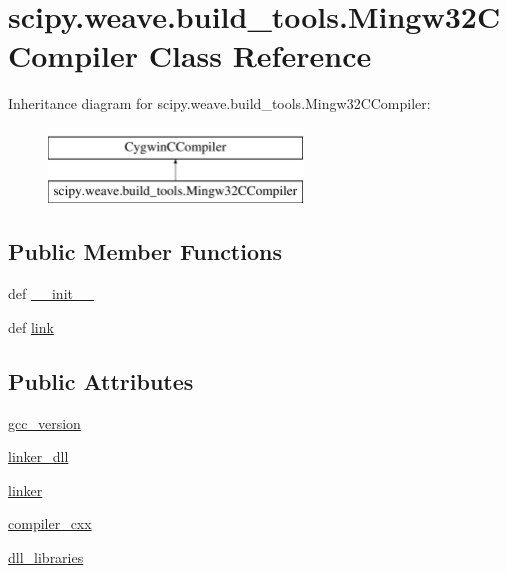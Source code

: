 \hypertarget{classscipy_1_1weave_1_1build__tools_1_1Mingw32CCompiler}{}\section{scipy.\+weave.\+build\+\_\+tools.\+Mingw32\+C\+Compiler Class Reference}
\label{classscipy_1_1weave_1_1build__tools_1_1Mingw32CCompiler}
Inheritance diagram for scipy.\+weave.\+build\+\_\+tools.\+Mingw32\+C\+Compiler\+:\begin{figure}[H]
\begin{center}
\leavevmode
\includegraphics[height=2.000000cm]{classscipy_1_1weave_1_1build__tools_1_1Mingw32CCompiler}
\end{center}
\end{figure}
\subsection*{Public Member Functions}
\begin{DoxyCompactItemize}
\item 
def \hyperlink{classscipy_1_1weave_1_1build__tools_1_1Mingw32CCompiler_a7158a768df4a22ba0ddea1d3d0777469}{\+\_\+\+\_\+init\+\_\+\+\_\+}
\item 
def \hyperlink{classscipy_1_1weave_1_1build__tools_1_1Mingw32CCompiler_ae91c41a2785c2f4e004429f391aac3ba}{link}
\end{DoxyCompactItemize}
\subsection*{Public Attributes}
\begin{DoxyCompactItemize}
\item 
\hyperlink{classscipy_1_1weave_1_1build__tools_1_1Mingw32CCompiler_a8cdb550c1234d730f656121fe3b57847}{gcc\+\_\+version}
\item 
\hyperlink{classscipy_1_1weave_1_1build__tools_1_1Mingw32CCompiler_a8b0d6030889b5179a6534915fa3e8366}{linker\+\_\+dll}
\item 
\hyperlink{classscipy_1_1weave_1_1build__tools_1_1Mingw32CCompiler_a6dff9c1f40fc32ff02819f6b313f0f91}{linker}
\item 
\hyperlink{classscipy_1_1weave_1_1build__tools_1_1Mingw32CCompiler_a4c697135ea807f3378a9226601ff63c9}{compiler\+\_\+cxx}
\item 
\hyperlink{classscipy_1_1weave_1_1build__tools_1_1Mingw32CCompiler_a087d6351de8e8317075891ee5f371448}{dll\+\_\+libraries}
\end{DoxyCompactItemize}
